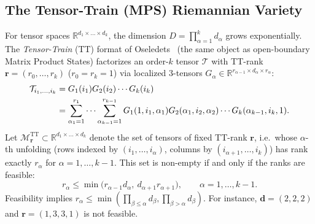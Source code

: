 \documentclass[11pt,a4paper,reqno]{amsart}
\theoremstyle{definition}
\numberwithin{equation}{section}
\providecommand{\R}{\mathbb{R}}
\providecommand{\R}{\mathbb{R}}
\begin{document}
\subsection{The Tensor-Train (MPS) Riemannian Variety}
\label{subsec:tensor_train_manifold}
For tensor spaces $\R^{d_1 \times \dots \times d_k}$, the dimension $D = \prod_{\alpha=1}^k d_\alpha$ grows exponentially. The \emph{Tensor-Train} (TT) format of Oseledets~\cite{oseledets2011tt} (the same object as open-boundary Matrix Product States) factorizes an order-$k$ tensor $\mathcal{T}$ with TT-rank $\mathbf{r} = (r_0, \dots, r_k)$ ($r_0 = r_k = 1$) via localized 3-tensors $G_\alpha \in \R^{r_{\alpha-1} \times d_\alpha \times r_\alpha}$:
\begin{align}
    \label{eq:tt_decomposition}
    \mathcal{T}_{i_1, \dots, i_k} &= G_1(i_1) G_2(i_2) \cdots G_k(i_k) \\
    &= \sum_{\alpha_1=1}^{r_1} \cdots \sum_{\alpha_{k-1}=1}^{r_{k-1}} G_1(1, i_1, \alpha_1) G_2(\alpha_1, i_2, \alpha_2) \cdots G_k(\alpha_{k-1}, i_k, 1). \notag
\end{align}
Let $\mathcal{M}_{\mathbf{r}}^{\mathrm{TT}} \subset \R^{d_1 \times \dots \times d_k}$ denote the set of tensors of fixed TT-rank $\mathbf{r}$, i.e.\ whose $\alpha$-th unfolding (rows indexed by $(i_1,\dots,i_\alpha)$, columns by $(i_{\alpha+1},\dots,i_k)$) has rank exactly $r_\alpha$ for $\alpha = 1,\dots,k-1$. This set is non-empty if and only if the ranks are feasible:
\begin{equation}
    \label{eq:tt_feasible}
    r_\alpha \le \min\big( r_{\alpha-1} d_\alpha,\ d_{\alpha+1} r_{\alpha+1} \big), \qquad \alpha = 1, \dots, k-1.
\end{equation}
Feasibility implies $r_\alpha \le \min(\prod_{\beta \le \alpha} d_\beta, \prod_{\beta > \alpha} d_\beta)$. For instance, $\mathbf{d} = (2,2,2)$ and $\mathbf{r} = (1,3,3,1)$ is not feasible.
\end{document}
